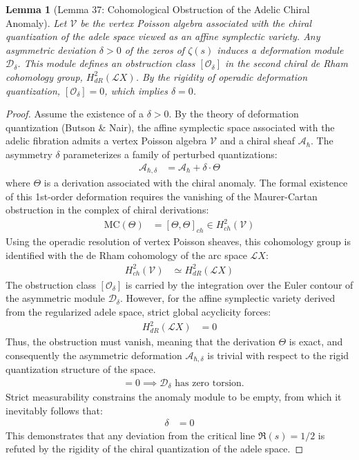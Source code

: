 \documentclass[
]{article}
\newtheorem{lemma}{Lemma}
\begin{document}
\begin{lemma}[Lemma 37: Cohomological Obstruction of the Adelic Chiral Anomaly]
Let $\mathcal{V}$ be the vertex Poisson algebra associated with the chiral quantization of the adele space viewed as an affine symplectic variety. Any asymmetric deviation $\delta > 0$ of the zeros of $\zeta(s)$ induces a deformation module $\mathcal{D}_\delta$. This module defines an obstruction class $[\mathcal{O}_\delta]$ in the second chiral de Rham cohomology group, $H^2_{dR}(\mathcal{L}X)$. By the rigidity of operadic deformation quantization, $[\mathcal{O}_\delta] = 0$, which implies $\delta = 0$.
\end{lemma}

\begin{proof}
Assume the existence of a $\delta > 0$. By the theory of deformation quantization (Butson \& Nair), the affine symplectic space associated with the adelic fibration admits a vertex Poisson algebra $\mathcal{V}$ and a chiral sheaf $\mathcal{A}_{\hbar}$.
The asymmetry $\delta$ parameterizes a family of perturbed quantizations:
\begin{align*}
\mathcal{A}_{\hbar,\delta} &= \mathcal{A}_{\hbar} + \delta \cdot \Theta
\end{align*}
where $\Theta$ is a derivation associated with the chiral anomaly.
The formal existence of this 1st-order deformation requires the vanishing of the Maurer-Cartan obstruction in the complex of chiral derivations:
\begin{align*}
\mathrm{MC}(\Theta) &= [\Theta, \Theta]_{ch} \in H^2_{ch}(\mathcal{V})
\end{align*}
Using the operadic resolution of vertex Poisson sheaves, this cohomology group is identified with the de Rham cohomology of the arc space $\mathcal{L}X$:
\begin{align*}
H^2_{ch}(\mathcal{V}) &\simeq H^2_{dR}(\mathcal{L}X)
\end{align*}
The obstruction class $[\mathcal{O}_\delta]$ is carried by the integration over the Euler contour of the asymmetric module $\mathcal{D}_\delta$. However, for the affine symplectic variety derived from the regularized adele space, strict global acyclicity forces:
\begin{align*}
H^2_{dR}(\mathcal{L}X) &= 0
\end{align*}
Thus, the obstruction must vanish, meaning that the derivation $\Theta$ is exact, and consequently the asymmetric deformation $\mathcal{A}_{\hbar,\delta}$ is trivial with respect to the rigid quantization structure of the space.
\begin{align*}
[\mathcal{O}_\delta] &= 0 \implies \mathcal{D}_\delta \text{ has zero torsion.}
\end{align*}
Strict measurability constrains the anomaly module to be empty, from which it inevitably follows that:
\begin{align*}
\delta &= 0
\end{align*}
This demonstrates that any deviation from the critical line $\Re(s) = 1/2$ is refuted by the rigidity of the chiral quantization of the adele space.
\end{proof}
\end{document}
